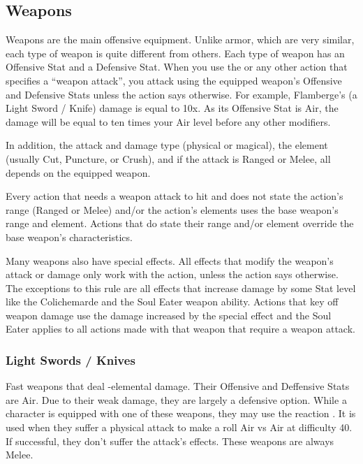 \clearpage
\subsection{Weapons}
\label{subsec:inv-weapons}

\begin{multicols}{2}
Weapons are the main offensive equipment.  Unlike armor, which are very similar, each type of weapon is quite different from others.  Each type of weapon has an Offensive Stat and a Defensive Stat.  When you use the  or any other action that specifies a ``weapon attack'', you attack using the equipped weapon's Offensive and Defensive Stats unless the action says otherwise.  For example, Flamberge's (a Light Sword / Knife) damage is equal to 10x.  As its Offensive Stat is Air, the damage will be equal to ten times your Air level before any other modifiers.

In addition, the attack and damage type (physical or magical), the element (usually Cut, Puncture, or Crush), and if the attack is Ranged or Melee, all depends on the equipped weapon.

Every action that needs a weapon attack to hit and does not state the action's range (Ranged or Melee) and/or the action's elements uses the base weapon's range and element.  Actions that do state their range and/or element override the base weapon's characteristics.

Many weapons also have special effects.  All effects that modify the weapon's attack or damage only work with the  action, unless the action says otherwise.  The exceptions to this rule are all effects that increase damage by some Stat level like the Colichemarde and the Soul Eater weapon ability.  Actions that key off weapon damage use the damage increased by the special effect and the Soul Eater applies to all actions made with that weapon that require a weapon attack.
\end{multicols}

\begin{center}
\end{center}
\clearpage

\subsubsection{Light Swords / Knives}

Fast weapons that deal -elemental damage.  Their Offensive and Deffensive Stats are Air.  Due to their weak damage, they are largely a defensive option.  While a character is equipped with one of these weapons, they may use the reaction .  It is used when they suffer a physical attack to make a roll Air vs Air at difficulty 40.  If successful, they don't suffer the attack's effects.  These weapons are always Melee.

\begin{tabwpn}[label=inv-lsword,range=melee,type=physical,element=puncture,roll=airvair]
    \tabwpnrow[name=Epee,mlevel=1,cost=55,damage=2x,effect=None]
\end{tabwpn}
